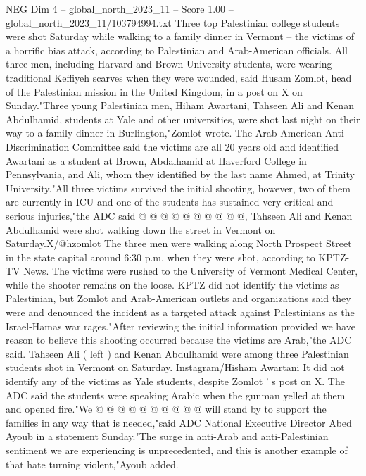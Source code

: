 \begin{textsample}{NEG Dim 4 – global\_north\_2023\_11 – Score 1.00 – global\_north\_2023\_11/103794994.txt}  \label{ex:f4_neg_258}
Three top Palestinian college students were shot Saturday while walking to a family dinner in Vermont -- the victims of a horrific bias attack, according to Palestinian and Arab-American officials.
All three men, including Harvard and Brown University students, were wearing traditional Keffiyeh scarves when they were wounded, said Husam Zomlot, head of the Palestinian mission in the United Kingdom, in a post on X on Sunday."Three young Palestinian men, Hiham Awartani, Tahseen Ali and Kenan Abdulhamid, students at Yale and other universities, were shot last night on their way to a family dinner in Burlington,"Zomlot wrote.
The Arab-American Anti-Discrimination Committee said the victims are all 20 years old and identified Awartani as a student at Brown, Abdalhamid at Haverford College in Pennsylvania, and Ali, whom they identified by the last name Ahmed, at Trinity University."All three victims survived the initial shooting, however, two of them are currently in ICU and one of the students has sustained very critical and serious injuries,"the ADC said @ @ @ @ @ @ @ @ @ @, Tahseen Ali and Kenan Abdulhamid were shot walking down the street in Vermont on Saturday.X/@hzomlot The three men were walking along North Prospect Street in the state capital around 6:30 p.m. when they were shot, according to KPTZ-TV News.
The victims were rushed to the University of Vermont Medical Center, while the shooter remains on the loose.
KPTZ did not identify the victims as Palestinian, but Zomlot and Arab-American outlets and organizations said they were and denounced the incident as a targeted attack against Palestinians as the Israel-Hamas war rages."After reviewing the initial information provided we have reason to believe this shooting occurred because the victims are Arab,"the ADC said.
Tahseen Ali ( left ) and Kenan Abdulhamid were among three Palestinian students shot in Vermont on Saturday.
Instagram/Hisham Awartani It did not identify any of the victims as Yale students, despite Zomlot ' s post on X.
The ADC said the students were speaking Arabic when the gunman yelled at them and opened fire."We @ @ @ @ @ @ @ @ @ @ will stand by to support the families in any way that is needed,"said ADC National Executive Director Abed Ayoub in a statement Sunday."The surge in anti-Arab and anti-Palestinian sentiment we are experiencing is unprecedented, and this is another example of that hate turning violent,"Ayoub added.

\end{textsample}
